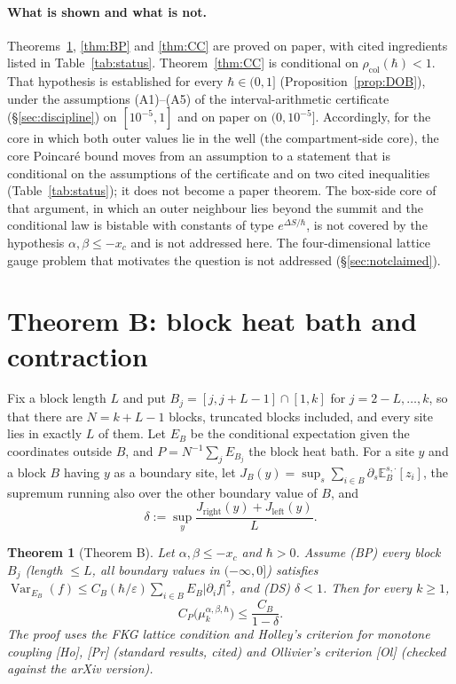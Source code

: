 \documentclass[11pt,a4paper]{article}
\newtheorem{theorem}{Theorem}[section]
\theoremstyle{definition}
\theoremstyle{remark}
\newcommand{\E}{\mathbb{E}}
\newcommand{\Var}{\operatorname{Var}}
\newcommand{\xc}{x_c}
\newcommand{\rcol}{\rho_{\mathrm{col}}}
\begin{document}
\paragraph{What is shown and what is not.} Theorems~\ref{thm:B}, \ref{thm:BP} and \ref{thm:CC} are proved on paper, with cited ingredients listed in Table~\ref{tab:status}. Theorem~\ref{thm:CC} is conditional on $\rcol(\hbar)<1$. That hypothesis is established for every $\hbar\in(0,1]$ (Proposition~\ref{prop:DOB}), under the assumptions (A1)--(A5) of the interval-arithmetic certificate (\S\ref{sec:discipline}) on $[10^{-5},1]$ and on paper on $(0,10^{-5}]$. Accordingly, for the core in which both outer values lie in the well (the compartment-side core), the core Poincar\'e bound moves from an assumption to a statement that is conditional on the assumptions of the certificate and on two cited inequalities (Table~\ref{tab:status}); it does not become a paper theorem. The box-side core of that argument, in which an outer neighbour lies beyond the summit and the conditional law is bistable with constants of type $e^{\Delta S/\hbar}$, is not covered by the hypothesis $\alpha,\beta\le-\xc$ and is not addressed here. The four-dimensional lattice gauge problem that motivates the question is not addressed (\S\ref{sec:notclaimed}).

\section{Theorem B: block heat bath and contraction}\label{sec:B}

Fix a block length $L$ and put $B_j=[j,j+L-1]\cap[1,k]$ for $j=2-L,\dots,k$, so that there are $N=k+L-1$ blocks, truncated blocks included, and every site lies in exactly $L$ of them. Let $E_B$ be the conditional expectation given the coordinates outside $B$, and $P=N^{-1}\sum_jE_{B_j}$ the block heat bath. For a site $y$ and a block $B$ having $y$ as a boundary site, let $J_B(y)=\sup_s\sum_{i\in B}\partial_s\E_B^{s,\cdot}[z_i]$, the supremum running also over the other boundary value of $B$, and
\[
\delta:=\sup_y\frac{J_{\mathrm{right}}(y)+J_{\mathrm{left}}(y)}{L}.
\]

\begin{theorem}[Theorem B]\label{thm:B}
Let $\alpha,\beta\le-\xc$ and $\hbar>0$. Assume
\textup{(BP)} every block $B_j$ \textup{(}length $\le L$, all boundary values in $(-\infty,0]$\textup{)} satisfies $\Var_{E_B}(f)\le C_B(\hbar/\varepsilon)\sum_{i\in B}E_B|\partial_if|^2$, and
\textup{(DS)} $\delta<1$.
Then for every $k\ge1$,
\[
C_P\big(\mu_k^{\alpha,\beta,\hbar}\big)\le\frac{C_B}{1-\delta}.
\]
The proof uses the FKG lattice condition and Holley's criterion for monotone coupling [Ho], [Pr] \textup{(}standard results, cited\textup{)} and Ollivier's criterion [Ol] \textup{(}checked against the arXiv version\textup{)}.
\end{theorem}
\end{document}
